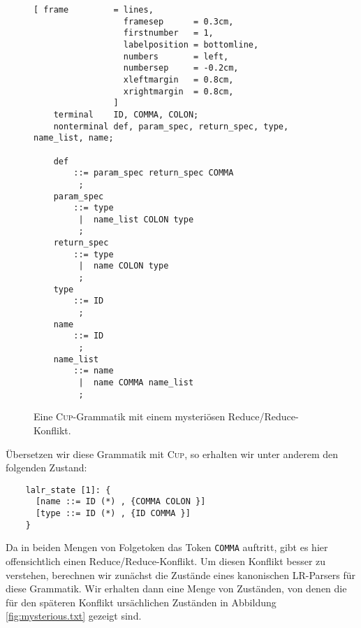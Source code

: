 \begin{figure}[!ht]
\centering
\begin{Verbatim}[ frame         = lines, 
                  framesep      = 0.3cm, 
                  firstnumber   = 1,
                  labelposition = bottomline,
                  numbers       = left,
                  numbersep     = -0.2cm,
                  xleftmargin   = 0.8cm,
                  xrightmargin  = 0.8cm,
                ]
    terminal    ID, COMMA, COLON;
    nonterminal def, param_spec, return_spec, type, name_list, name;
    
    def   
        ::= param_spec return_spec COMMA
         ;
    param_spec
        ::= type
         |  name_list COLON type
         ;    
    return_spec
        ::= type
         |  name COLON type
         ;
    type  
        ::= ID
         ;    
    name
        ::= ID
         ;
    name_list
        ::= name
         |  name COMMA name_list
         ;
\end{Verbatim}
\vspace*{-0.3cm}
\caption{Eine \textsc{Cup}-Grammatik mit einem mysteri\"osen Reduce/Reduce-Konflikt.}
\label{fig:mysterious.cup}
\end{figure}
\vspace*{0.3cm}

\"Ubersetzen wir diese Grammatik mit \textsc{Cup}, so erhalten wir unter anderem den folgenden Zustand:
\begin{verbatim}
    lalr_state [1]: {
      [name ::= ID (*) , {COMMA COLON }]
      [type ::= ID (*) , {ID COMMA }]
    }
\end{verbatim}
Da in beiden Mengen von Folgetoken das Token \texttt{COMMA} auftritt, gibt es hier offensichtlich einen
Reduce/Reduce-Konflikt.   Um diesen Konflikt besser zu verstehen, berechnen wir zun\"achst die Zust\"ande
eines kanonischen LR-Parsers f\"ur diese Grammatik.
Wir erhalten dann eine Menge von Zust\"anden, von denen die f\"ur den sp\"ateren Konflikt urs\"achlichen 
Zust\"anden in Abbildung \ref{fig:mysterious.txt} gezeigt sind.

